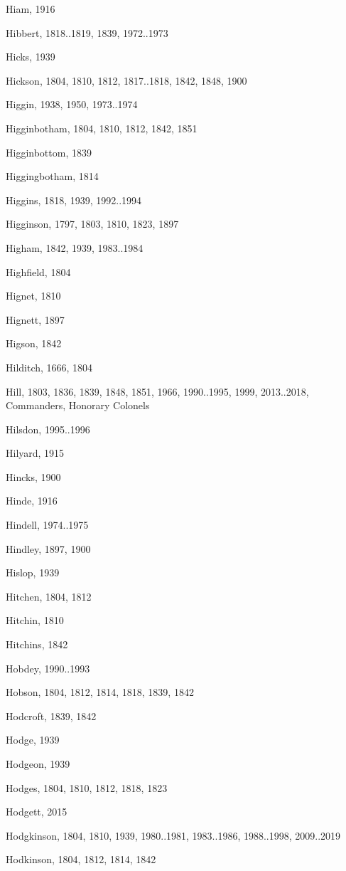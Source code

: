 \begin{theindex}
\item Hiam, 1916
\item Hibbert, 1818..1819, 1839, 1972..1973
\item Hicks, 1939
\item Hickson, 1804, 1810, 1812, 1817..1818, 1842, 1848, 1900
\item Higgin, 1938, 1950, 1973..1974
\item Higginbotham, 1804, 1810, 1812, 1842, 1851
\item Higginbottom, 1839
\item Higgingbotham, 1814
\item Higgins, 1818, 1939, 1992..1994
\item Higginson, 1797, 1803, 1810, 1823, 1897
\item Higham, 1842, 1939, 1983..1984
\item Highfield, 1804
\item Hignet, 1810
\item Hignett, 1897
\item Higson, 1842
\item Hilditch, 1666, 1804
\item Hill, 1803, 1836, 1839, 1848, 1851, 1966, 1990..1995, 1999, 2013..2018, Commanders, Honorary Colonels
\item Hilsdon, 1995..1996
\item Hilyard, 1915
\item Hincks, 1900
\item Hinde, 1916
\item Hindell, 1974..1975
\item Hindley, 1897, 1900
\item Hislop, 1939
\item Hitchen, 1804, 1812
\item Hitchin, 1810
\item Hitchins, 1842
\item Hobdey, 1990..1993
\item Hobson, 1804, 1812, 1814, 1818, 1839, 1842
\item Hodcroft, 1839, 1842
\item Hodge, 1939
\item Hodgeon, 1939
\item Hodges, 1804, 1810, 1812, 1818, 1823
\item Hodgett, 2015
\item Hodgkinson, 1804, 1810, 1939, 1980..1981, 1983..1986, 1988..1998, 2009..2019
\item Hodkinson, 1804, 1812, 1814, 1842

\end{theindex}
